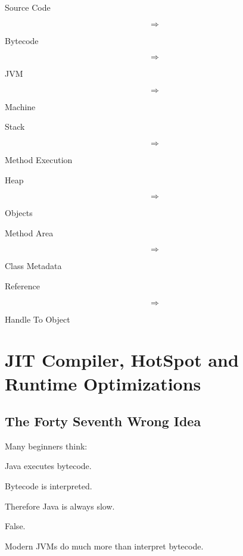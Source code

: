 \documentclass[11pt,a4paper]{book}
\begin{document}
\begin{compressionbox}

Source Code

\[
\Rightarrow
\]

Bytecode

\[
\Rightarrow
\]

JVM

\[
\Rightarrow
\]

Machine

\vspace{0.5em}

Stack

\[
\Rightarrow
\]

Method Execution

\vspace{0.5em}

Heap

\[
\Rightarrow
\]

Objects

\vspace{0.5em}

Method Area

\[
\Rightarrow
\]

Class Metadata

\vspace{0.5em}

Reference

\[
\Rightarrow
\]

Handle To Object

\end{compressionbox}

\chapter{JIT Compiler, HotSpot and Runtime Optimizations}

\section{The Forty Seventh Wrong Idea}

\begin{trap}

Many beginners think:


Java executes bytecode.


Bytecode is interpreted.


Therefore Java is always slow.


False.


Modern JVMs do much more than
interpret bytecode.

\end{trap}
\end{document}
